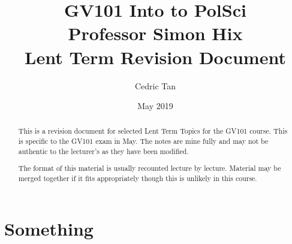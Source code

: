 \documentclass[12pt, letterpaper]{article}
\title{
	{GV101 Into to PolSci}\\
	{\large{Professor Simon Hix}}\\
	{\large{Lent Term Revision Document}}
}
\author{Cedric Tan}
\date{May 2019}
\begin{document}
\maketitle
\begin{abstract}

	This is a revision document for selected Lent Term Topics for the GV101 course. This is specific to the GV101 exam in May. The notes are mine fully and may not be authentic to the lecturer's as they have been modified.

	The format of this material is usually recounted lecture by lecture. Material may be merged together if it fits appropriately though this is unlikely in this course.

\end{abstract}
\newpage
\tableofcontents
\newpage

\section{Something}
\end{document}
